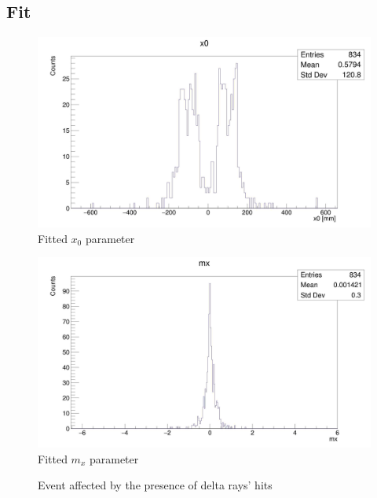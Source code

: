\documentclass[10pt, a4paper, twocolumn]{article} %
\begin{document}
\subsection{Fit}

\begin{figure}[h!]
    \centering
    \includegraphics[width=0.8 \textwidth]{img/x0.jpg}
    \caption{Fitted $x_0$ parameter}
    \label{fig:x0}
\end{figure}

\begin{figure}[h!]
    \centering
    \includegraphics[width=0.8 \textwidth]{img/mx.jpg}
    \caption{Fitted $m_x$ parameter}
    \label{fig:mx}
\end{figure}

\onecolumn
\begin{figure}[h!]
    \centering
    \caption{Event affected by the presence of delta rays' hits}
    \label{fig:bad}
\end{figure}
\end{document}
